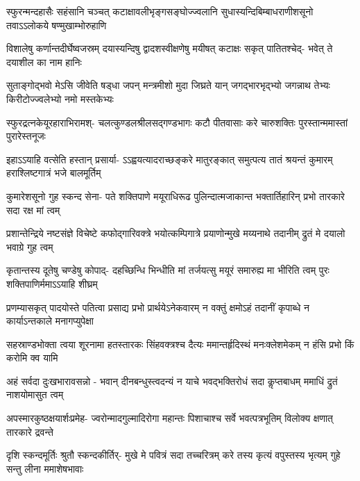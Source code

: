 \fourlineindentedshloka
{स्फुरन्मन्दहासैः सहंसानि चञ्चत्}
{कटाक्षावलीभृङ्गसङ्घोज्ज्वलानि}
{सुधास्यन्दिबिम्बाधराणीशसूनो}
{तवाऽऽलोकये षण्मुखाम्भोरुहाणि}

\fourlineindentedshloka
{विशालेषु कर्णान्तदीर्घेष्वजस्रम्}
{दयास्यन्दिषु द्वादशस्वीक्षणेषु}
{मयीषत् कटाक्षः सकृत् पातितश्चेद्-}
{भवेत् ते दयाशील का नाम हानिः}

\fourlineindentedshloka
{सुताङ्गोद्भवो मेऽसि जीवेति षड्धा}
{जपन् मन्त्रमीशो मुदा जिघ्रते यान्}
{जगद्भारभृद्भ्यो जगन्नाथ तेभ्यः}
{किरीटोज्ज्वलेभ्यो नमो मस्तकेभ्यः}

\fourlineindentedshloka
{स्फुरद्रत्नकेयूरहाराभिरामश्-}
{चलत्कुण्डलश्रीलसद्गण्डभागः}
{कटौ पीतवासाः करे चारुशक्तिः}
{पुरस्तान्ममास्तां पुरारेस्तनूजः}

\fourlineindentedshloka
{इहाऽऽयाहि वत्सेति हस्तान् प्रसार्या-}
{ऽऽह्वयत्यादराच्छङ्करे मातुरङ्कात्}
{समुत्पत्य तातं श्रयन्तं कुमारम्}
{हराश्लिष्टगात्रं भजे बालमूर्तिम्}

\fourlineindentedshloka
{कुमारेशसूनो गुह स्कन्द सेना-}
{पते शक्तिपाणे मयूराधिरूढ}
{पुलिन्दात्मजाकान्त भक्तार्तिहारिन्}
{प्रभो तारकारे सदा रक्ष मां त्वम्}

\fourlineindentedshloka
{प्रशान्तेन्द्रिये नष्टसंज्ञे विचेष्टे}
{कफोद्गारिवक्त्रे भयोत्कम्पिगात्रे}
{प्रयाणोन्मुखे मय्यनाथे तदानीम्}
{द्रुतं मे दयालो भवाग्रे गुह त्वम्}

\fourlineindentedshloka
{कृतान्तस्य दूतेषु चण्डेषु कोपाद्-}
{दहच्छिन्धि भिन्धीति मां तर्जयत्सु}
{मयूरं समारुह्य मा भीरिति त्वम्}
{पुरः शक्तिपाणिर्ममाऽऽयाहि शीघ्रम्}

\fourlineindentedshloka
{प्रणम्यासकृत् पादयोस्ते पतित्वा}
{प्रसाद्य प्रभो प्रार्थयेऽनेकवारम्}
{न वक्तुं क्षमोऽहं तदानीं कृपाब्धे}
{न कार्याऽन्तकाले मनागप्युपेक्षा}

\fourlineindentedshloka
{सहस्राण्डभोक्ता त्वया शूरनामा}
{हतस्तारकः सिंहवक्त्रश्च दैत्यः}
{ममान्तर्हृदिस्थं मनःक्लेशमेकम्}
{न हंसि प्रभो किं करोमि क्व यामि}

\fourlineindentedshloka
{अहं सर्वदा दुःखभारावसन्नो -}
{भवान् दीनबन्धुस्त्वदन्यं न याचे}
{भवद्भक्तिरोधं सदा कॢप्तबाधम्}
{ममाधिं द्रुतं नाशयोमासुत त्वम्}

\fourlineindentedshloka
{अपस्मारकुष्ठक्षयार्शःप्रमेह-}
{ज्वरोन्मादगुल्मादिरोगा महान्तः}
{पिशाचाश्च सर्वे भवत्पत्रभूतिम्}
{विलोक्य क्षणात् तारकारे द्रवन्ते}

\fourlineindentedshloka
{दृशि स्कन्दमूर्तिः श्रुतौ स्कन्दकीर्तिर्-}
{मुखे मे पवित्रं सदा तच्चरित्रम्}
{करे तस्य कृत्यं वपुस्तस्य भृत्यम्}
{गुहे सन्तु लीना ममाशेषभावाः}

